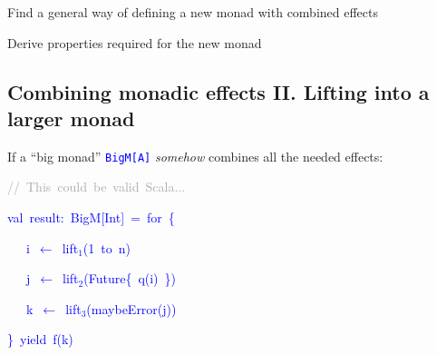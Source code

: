 Find a general way of defining a new monad with combined effects

Derive properties required for the new monad


\subsection{Combining monadic effects II. Lifting into a larger monad}

{\footnotesize{}\vspace{-0.15cm}}If a ``big monad'' \texttt{\textcolor{blue}{\footnotesize{}BigM{[}A{]}}}
\emph{somehow} combines all the needed effects:

{\footnotesize{}\vspace{-0.15cm}\hspace{-0.35cm}}\texttt{\textcolor{blue}{\footnotesize{}}}%
\begin{minipage}[t]{0.49\columnwidth}%
\begin{lyxcode}
\textrm{\textcolor{darkgray}{\footnotesize{}//~This~could~be~valid~Scala...}}{\footnotesize\par}

\textcolor{blue}{\footnotesize{}val~result:~BigM{[}Int{]}~=~for~\{}{\footnotesize\par}

\textcolor{blue}{\footnotesize{}~~~i~$\leftarrow$~lift$_{1}$(1~to~n)}{\footnotesize\par}

\textcolor{blue}{\footnotesize{}~~~j~$\leftarrow$~lift$_{2}$(Future\{~q(i)~\})}{\footnotesize\par}

\textcolor{blue}{\footnotesize{}~~~k~$\leftarrow$~lift$_{3}$(maybeError(j))}{\footnotesize\par}

\textcolor{blue}{\footnotesize{}\}~yield~f(k)}{\footnotesize\par}
\end{lyxcode}
%
\end{minipage}\texttt{\textcolor{blue}{\footnotesize{} }}%

